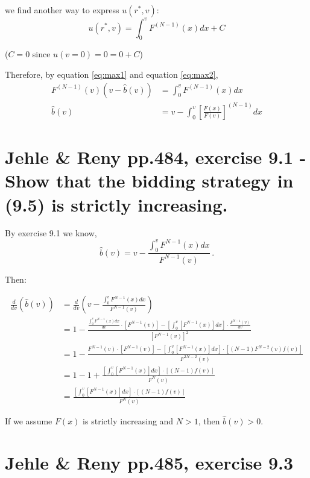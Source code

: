 \documentclass{article}
\begin{document}
we find another way to express $u(r^*,v)$:
\begin{equation}
u(r^*,v) = \int_0^v F^{(N-1)}(x) dx + C
    \label{eq:max2}   
\end{equation}

($C=0$ since $u(v=0) =0 = 0 +C$)

Therefore, by equation \ref{eq:max1} and equation \ref{eq:max2},
\begin{align*}
F^{(N-1)}(v) (v-\hat{b}(v)) &= \int_0^v F^{(N-1)}(x) dx \\
\hat{b}(v)&= v - \int_0^v \left[\frac{F(x)}{F(v)}\right]^{(N-1)} dx 
\end{align*}


\section{Jehle \& Reny pp.484, exercise 9.1 - Show that the bidding strategy in (9.5) is strictly increasing.}

By exercise 9.1 we know,
$$\hat{b}(v) = v - \frac{\int_0^v F^{N-1}(x) dx}{F^{N-1}(v)} \, .$$

Then:

\begin{align*}
  \frac{d}{dv}\left( \hat{b}(v) \right) &= \frac{d}{dv}\left( v - \frac{\int_0^v F^{N-1}(x) dx}{F^{N-1}(v)} \right) \\
  &= 1 - \frac{\frac{\int_0^vF^{N-1}(x) dx }{dv} \cdot [F^{N-1}(v)]- \left[\int_0^v[F^{N-1}(x)] dx \right] \cdot \frac{F^{N-1}(v)}{dv}}{\left[F^{N-1}(v)\right]^2}\\
  &= 1 - \frac{F^{N-1}(v) \cdot [F^{N-1}(v)] - \left[\int_0^v[F^{N-1}(x)] dx \right] \cdot [(N-1) F^{N-2}(v) f(v)]} {F^{2N-2}(v)} \\
  &= 1 - 1 + \frac{\left[\int_0^v[F^{N-1}(x)] dx \right] \cdot [(N-1) f(v)]} {F^{N}(v)} \\
  &= \frac{\left[\int_0^v[F^{N-1}(x)] dx \right] \cdot [(N-1) f(v)]} {F^{N}(v)}
\end{align*}

If we assume $F(x)$ is strictly increasing and $N > 1$, then $\hat{b}(v) > 0$.

\section{Jehle \& Reny pp.485, exercise 9.3}
\end{document}
